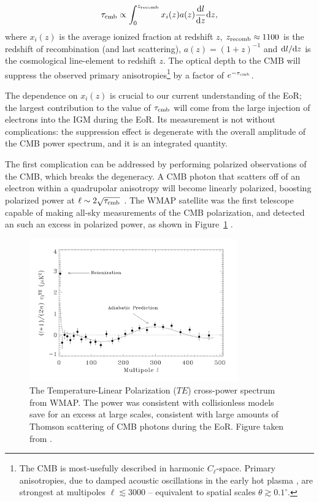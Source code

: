 \begin{equation}
\tau_{\rm cmb} \propto \int^{z_{\rm recomb}}_0 x_i(z) a(z) \frac{{\rm d}l}{{\rm d}z}{\rm d}z,
\label{eq:eor_intro_tau_cmb}
\end{equation}
where $x_i(z)$ is the average ionized fraction at redshift $z$, $z_{\rm recomb}\approx1100$ is the redshift of recombination (and last scattering), $a(z) = (1+z)^{-1}$ and  ${\rm d}l/{\rm d}z$ is the cosmological line-element to redshift $z$. The optical depth to the CMB will suppress the observed primary anisotropies\footnote{The CMB is most-usefully described in harmonic $C_{\ell}$-space. Primary anisotropies, due to damped acoustic oscillations in the early hot plasma \citep{Silk.68}, are strongest at multipoles $\ell\lesssim3000$ -- equivalent to spatial scales $\theta \gtrsim 0.1^{\circ}$.} by a factor of $e^{-\tau_{\rm cmb}}$.

The dependence on $x_i(z)$ is crucial to our current understanding of the EoR; the largest contribution to the value of $\tau_{\rm cmb}$ will come from the large injection of electrons into the IGM during the EoR. Its measurement is not without complications: the suppression effect is degenerate with the overall amplitude of the CMB power spectrum, and it is an integrated quantity. 

The first complication can be addressed by performing polarized observations of the CMB, which breaks the degeneracy. A CMB photon that scatters off of an electron within a quadrupolar anisotropy will become linearly polarized, boosting polarized power at $\ell\sim2\sqrt{\tau_{\rm cmb}}$ \citep{Zaldarriaga.97.pol}. The WMAP satellite was the first telescope capable of making all-sky measurements of the CMB polarization, and detected an such an excess in polarized power, as shown in Figure~\ref{fig:eor_intro_spergel_tau} \citep{Kogut.03, Spergel.03}.

\begin{figure}
\centering
\includegraphics[width=0.8\textwidth]{chapters/eor_intro/figures/spergel_tau.png}
\caption[The $TE$ cross-power spectrum from WMAP.]{The Temperature-Linear Polarization ($TE$) cross-power spectrum from WMAP. The power was consistent with collisionless models save for an excess at large scales, consistent with large amounts of Thomson scattering of CMB photons during the EoR. Figure taken from \cite{Spergel.03}.}
\label{fig:eor_intro_spergel_tau}
\end{figure}

